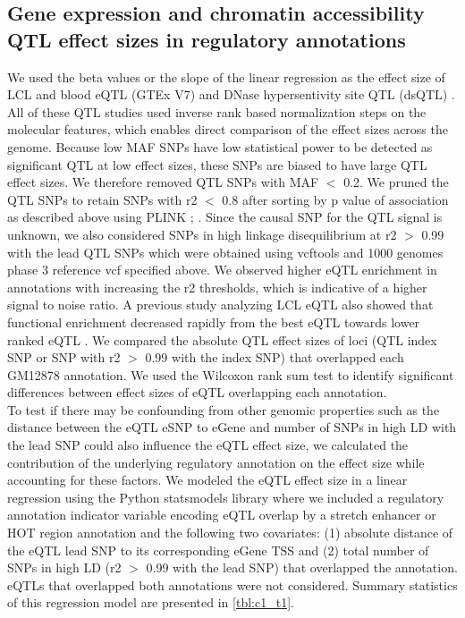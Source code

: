 \subsection{Gene expression and chromatin accessibility QTL effect sizes in regulatory annotations}
We used the beta values or the slope of the linear regression as the effect size of LCL and blood eQTL (GTEx V7) and DNase hypersentivity site QTL (dsQTL) \cite{degnerDNaseSensitivityQTLs2012}. All of these QTL studies used inverse rank based normalization steps on the molecular features, which enables direct comparison of the effect sizes across the genome. Because low MAF SNPs have low statistical power to be detected as significant QTL at low effect sizes, these SNPs are biased to have large QTL effect sizes. We therefore removed QTL SNPs with MAF $<$ 0.2. We pruned the QTL SNPs to retain SNPs with r2 $<$ 0.8 after sorting by p value of association as described above using PLINK \cite{purcellPLINKToolSet2007}; \cite{changSecondgenerationPLINKRising2015}. Since the causal SNP for the QTL signal is unknown, we also considered SNPs in high linkage disequilibrium at r2 $>$ 0.99 with the lead QTL SNPs which were obtained using vcftools\cite{danecekVariantCallFormat2011} and 1000 genomes phase 3 reference vcf specified above. We observed higher eQTL enrichment in annotations with increasing the r2 thresholds, which is indicative of a higher signal to noise ratio. A previous study analyzing LCL eQTL also showed that functional enrichment decreased rapidly from the best eQTL towards lower ranked eQTL \cite{lappalainenTranscriptomeGenomeSequencing2013}. We compared the absolute QTL effect sizes of loci (QTL index SNP or SNP with r2 $>$ 0.99 with the index SNP) that overlapped each GM12878 annotation. We used the Wilcoxon rank sum test to identify significant differences between effect sizes of eQTL overlapping each annotation. \\
To test if there may be confounding from other genomic properties such as the distance between the eQTL eSNP to eGene and number of SNPs in high LD with the lead SNP could also influence the eQTL effect size, we calculated the contribution of the underlying regulatory annotation on the effect size while accounting for these factors. We modeled the eQTL effect size in a linear regression using the Python statsmodels library where we included a regulatory annotation indicator variable encoding eQTL overlap by a stretch enhancer or HOT region annotation and the following two covariates: (1) absolute distance of the eQTL lead SNP to its corresponding eGene TSS and (2) total number of SNPs in high LD (r2 $>$ 0.99 with the lead SNP) that overlapped the annotation. eQTLs that overlapped both annotations were not considered. Summary statistics of this regression model are presented in \ref{tbl:c1_t1}. \\

